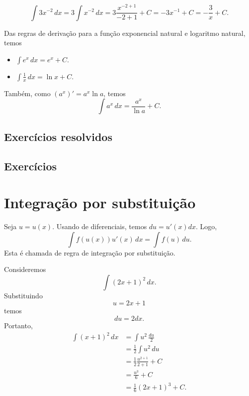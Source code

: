 \begin{ex}
  \begin{equation}
    \int 3x^{-2}\,dx = 3\int x^{-2}\,dx = 3\frac{x^{-2+1}}{-2+1} + C = -3x^{-1} + C = -\frac{3}{x} + C.
  \end{equation}
\end{ex}

Das regras de derivação para a função exponencial natural e logaritmo natural, temos
\begin{itemize}
\item $\displaystyle \int e^x\,dx = e^x + C$.
\item $\displaystyle \int \frac{1}{x}\,dx = \ln x + C$.
\end{itemize}
Também, como $(a^x)' = a^x\ln a$, temos
\begin{equation}
  \int a^x\,dx = \frac{a^x}{\ln a} + C.
\end{equation}

\subsection*{Exercícios resolvidos}

\emconstrucao

\subsection{Exercícios}

\emconstrucao

\section{Integração por substituição}

Seja $u = u(x)$. Usando de diferenciais, temos $du = u'(x)dx$. Logo,
\begin{equation}
  \int f(u(x))u'(x)\,dx = \int f(u)\,du.
\end{equation}
Esta é chamada de regra de integração por substituição.

\begin{ex}
  Consideremos
  \begin{equation}
    \int (2x+1)^2\,dx.
  \end{equation}
  Substituindo
  \begin{equation}
    u = 2x+1
  \end{equation}
  temos
  \begin{equation}
    du = 2dx.
  \end{equation}
  Portanto,
  \begin{align}
    \int (x+1)^2\,dx &= \int u^2\,\frac{du}{2}\\
                     &= \frac{1}{2}\int u^2\,du\\
                     &= \frac{1}{2}\frac{u^{2+1}}{2+1} + C\\
                     &= \frac{u^3}{6} + C\\
                     &= \frac{1}{6}(2x+1)^3 + C.
  \end{align}
\end{ex}

